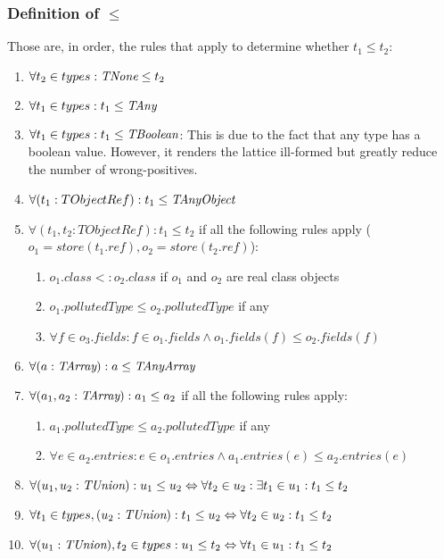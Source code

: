 \documentclass[a4paper]{article}
\begin{document}
\subsubsection{Definition of $\leq$}
Those are, in order, the rules that apply to determine whether $t_1 \leq t_2$:
\begin{enumerate}
  \item $\forall t_2 \in types : \emph{TNone} \leq t_2$
  \item $\forall t_1 \in types : t_1 \leq \emph{TAny}$
  \item $\forall t_1 \in types : t_1 \leq \emph{TBoolean}$: This is due to the fact
    that any type has a boolean value. However, it renders the lattice
    ill-formed but greatly reduce the number of wrong-positives.
  \item $\forall (t_1:  TObjectRef): t_1 \leq \emph{TAnyObject}$
  \item $\forall (t_1,t_2: TObjectRef): t_1 \leq t_2$
    if all the following rules apply ($o_1 = store(t_1.ref), o_2 = store(t_2.ref)$):
    \begin{enumerate}
        \item $o_1.class <: o_2.class$ if $o_1$ and $o_2$ are real class objects
        \item $o_1.pollutedType \leq o_2.pollutedType$ if any
        \item $\forall f \in o_3.fields: f \in o_1.fields \wedge o_1.fields(f)
          \leq o_2.fields(f)$
    \end{enumerate}
  \item $\forall (a: \emph{TArray}) : a \leq \emph{TAnyArray}$
  \item $\forall (a_1,a_2: \emph{TArray}) : a_1 \leq a_2$
    if all the following rules apply:
    \begin{enumerate}
        \item $a_1.pollutedType \leq a_2.pollutedType$ if any
        \item $\forall e \in a_2.entries: e \in o_1.entries \wedge a_1.entries(e)
          \leq a_2.entries(e)$
    \end{enumerate}
  \item $\forall (u_1,u_2: \emph{TUnion}) : u_1 \leq u_2 \Leftrightarrow \forall t_2 \in u_2: \exists t_1 \in u_1: t_1 \leq t_2$
  \item $\forall t_1 \in types, (u_2: \emph{TUnion}) : t_1 \leq u_2 \Leftrightarrow \forall t_2 \in u_2: t_1 \leq t_2$
  \item $\forall (u_1: \emph{TUnion}), t_2 \in types : u_1 \leq t_2 \Leftrightarrow \forall t_1 \in u_1: t_1 \leq t_2$
\end{enumerate}
\end{document}
